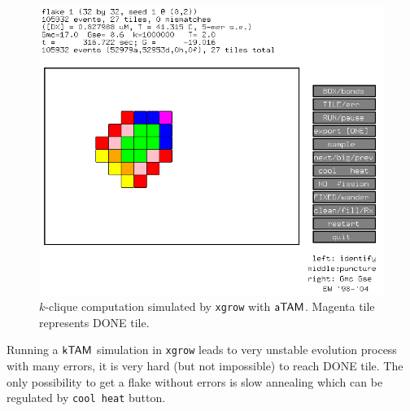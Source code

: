 \begin{figure}[h]
\begin{center}
	\includegraphics[scale=0.55]{./figures/xgrow/xgrow.png}
	\caption{$k$-clique computation simulated by {\tt xgrow} with $\mathsf{aTAM}$. Magenta tile represents DONE tile.}
	\label{fig:xgrow}
\end{center}
\end{figure}

Running a $\mathsf{kTAM}$ simulation in {\tt xgrow} leads to very unstable evolution process with many errors, it is very hard (but not impossible) to reach DONE tile. The only possibility to get a flake without errors is slow annealing which can be regulated by {\tt cool heat} button.